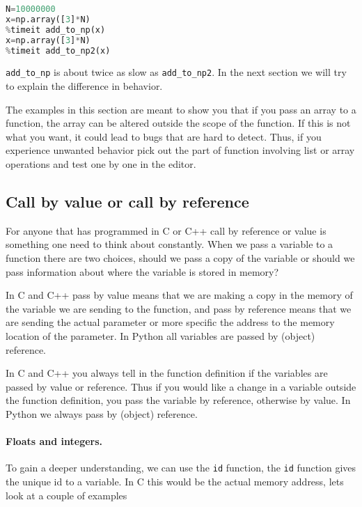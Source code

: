 \documentclass[graybox,sectrefs,envcountresetchap,open=right,final]{svmonodo}
\newenvironment{graybox2admon}[1][]{
\begin{graybox2mdframed}[frametitle=#1]
}
{
\end{graybox2mdframed}
}
\begin{document}
\begin{lstlisting}[language=python,style=blue1bar]
N=10000000
x=np.array([3]*N)
%timeit add_to_np(x)
x=np.array([3]*N)
%timeit add_to_np2(x)

\end{lstlisting}

\Verb!add_to_np! is about twice as slow as \Verb!add_to_np2!. In the next section we will try to explain the difference in behavior.



\begin{graybox2admon}[Avoiding unwanted behavior of functions]
The examples in this section are meant to show you that if you pass an array to a function, the array can be altered outside the scope of the function. If this is not what you want, it could lead to bugs that are hard to detect. Thus, if you experience unwanted behavior pick out the part of function involving list or array operations and test one by one in the editor.
\end{graybox2admon}




\subsection{Call by value or call by reference}
For anyone that has programmed in C or C++ call by reference or value is something one need to think about constantly. When we pass a variable to a function there are two choices, should we pass a copy of the variable or should we pass information about where the variable is stored in memory?


\begin{graybox2admon}[Value and reference]
In C and C++ pass by value means that we are making a copy in the memory of the variable we are sending to the function, and pass by reference means that we are sending the actual parameter or more specific the address to the memory location of the parameter. In Python all variables are passed by (object) reference.
\end{graybox2admon}



In C and C++ you always tell in the function definition if the variables are passed by value or reference. Thus if you would like a change in a variable outside the function definition, you pass the variable by reference, otherwise by value. In Python we always pass by (object) reference.

\paragraph{Floats and integers.}
To gain a deeper understanding, we can use the \texttt{id} function, the \texttt{id} function gives the unique id to a variable. In C this would be the actual memory address, lets look at a couple of examples
\end{document}
